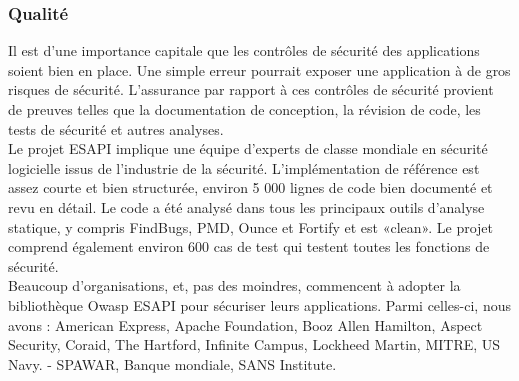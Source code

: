 \subsubsection{Qualité}
Il est d'une importance capitale que les contrôles de sécurité des applications soient bien en place. Une simple erreur pourrait exposer une application à de gros risques de sécurité. L'assurance par rapport à ces contrôles de sécurité provient de preuves telles que la documentation de conception, la révision de code, les tests de sécurité et autres analyses.\\
Le projet ESAPI implique une équipe d'experts de classe mondiale en sécurité logicielle issus de l'industrie de la sécurité. L'implémentation de référence est assez courte et bien structurée, environ 5 000 lignes de code bien documenté et revu en détail. Le code a été analysé dans tous les principaux outils d'analyse statique, y compris FindBugs, PMD, Ounce et Fortify et est «clean». Le projet comprend également environ 600 cas de test qui testent toutes les fonctions de sécurité.\\
Beaucoup d'organisations, et, pas des moindres, commencent à adopter la bibliothèque Owasp ESAPI pour sécuriser leurs applications. Parmi celles-ci, nous avons : American Express, Apache Foundation, Booz Allen Hamilton, Aspect Security, Coraid, The Hartford, Infinite Campus, Lockheed Martin, MITRE, US Navy. - SPAWAR, Banque mondiale, SANS Institute.
